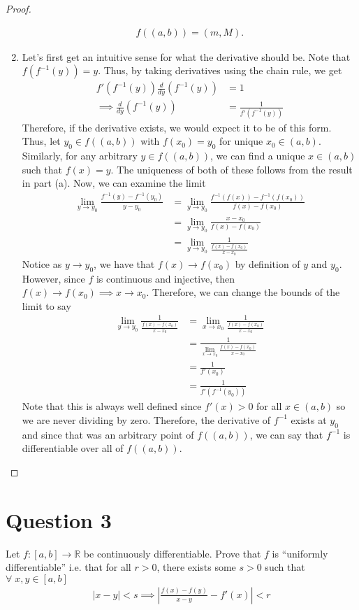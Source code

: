 \documentclass[10pt,a4paper]{article}
\theoremstyle{definition}
\theoremstyle{definition}
\numberwithin{equation}{section}
\begin{document}
\begin{proof}
\begin{enumerate}[label = (\alph*)]
\begin{align*}
f((a, b)) = (m, M).
\end{align*}
\item Let's first get an intuitive sense for what the derivative should be. Note that $f(f^{-1}(y)) = y$. Thus, by taking derivatives using the chain rule, we get
\begin{align*}
f'(f^{-1}(y)) \frac{d}{dy}(f^{-1}(y)) &= 1\\
\implies \frac{d}{dy}(f^{-1}(y)) &= \frac{1}{f'(f^{-1}(y))}
\end{align*}
Therefore, if the derivative exists, we would expect it to be of this form. Thus, let $y_0 \in f((a, b))$ with $f(x_0) = y_0$ for unique $x_0 \in (a, b)$. Similarly, for any arbitrary $y \in f((a, b))$, we can find a unique $x \in (a, b)$ such that $f(x) = y$. The uniqueness of both of these follows from the result in  part (a). Now, we can examine the limit
\begin{align*}
\lim_{y \to y_0} \frac{f^{-1}(y) - f^{-1}(y_0)}{y - y_0} &= \lim_{y \to y_0} \frac{f^{-1}(f(x)) - f^{-1}(f(x_0))}{f(x) - f(x_0)}\\
&= \lim_{y \to y_0} \frac{x - x_0}{f(x) - f(x_0)}\\
&= \lim_{y \to y_0} \frac{1}{\frac{f(x) - f(x_0)}{x - x_0}}
\end{align*}
Notice as $y \to y_0$, we have that $f(x) \to f(x_0)$ by definition of $y$ and $y_0$. However, since $f$ is continuous and injective, then $f(x) \to f(x_0) \implies x \to x_0$. Therefore, we can change the bounds of the limit to say
\begin{align*}
\lim_{y \to y_0} \frac{1}{\frac{f(x) - f(x_0)}{x - x_0}} &= \lim_{x \to x_0} \frac{1}{\frac{f(x) - f(x_0)}{x - x_0}}\\
&= \frac{1}{\lim_{x \to x_0} \frac{f(x) - f(x_0)}{x - x_0}}\\
&= \frac{1}{f'(x_0)}\\
&= \frac{1}{f'(f^{-1}(y_0))}
\end{align*}
Note that this is always well defined since $f'(x) > 0$ for all $x \in (a, b)$ so we are never dividing by zero. Therefore, the derivative of $f^{-1}$ exists at $y_0$ and since that was an arbitrary point of $f((a, b))$, we can say that $f^{-1}$ is differentiable over all of $f((a, b))$. 
\end{enumerate}
\end{proof}

\section*{Question 3}
Let $f: [a, b] \to \mathbb{R}$ be continuously differentiable. Prove that $f$ is \enquote{uniformly differentiable} i.e. that
for all $r > 0$, there exists some $s > 0$ such that $\forall \; x, y \in [a, b]$
\begin{align*}
|x - y| < s \implies \left| \frac{f(x) - f(y)}{x - y} - f'(x)\right| < r
\end{align*}
\end{document}
